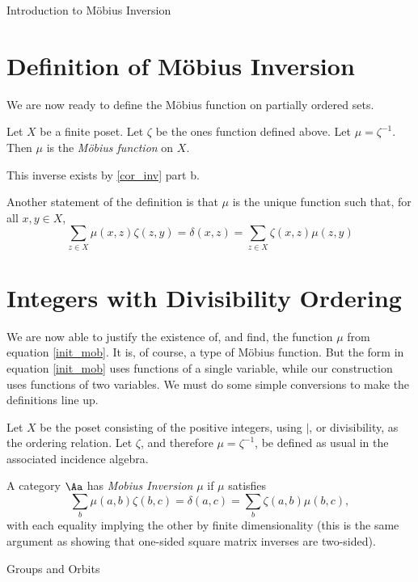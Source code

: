 \documentclass[12pt]{pom_thesis}
\begin{document}
\begin{chapter}{Introduction to M\"obius Inversion}
\section{Definition of M\"obius Inversion}
We are now ready to define the M\"obius function on partially ordered sets.
\begin{defn}\label{def_mob_pos}
Let $X$ be a finite poset. Let $\zeta$ be the ones function defined above. Let $\mu = \zeta^{-1}$. Then $\mu$ is the \emph{M\"obius function} on $X$.
\end{defn}
\begin{rmk}
This inverse exists by \ref{cor_inv} part b. 
\end{rmk}
\begin{rmk}
Another statement of the definition is that $\mu$ is the unique function such that, for all $x,y \in X$,
\[
\sum_{z \in X} \mu(x,z)\zeta(z,y) = \delta(x,z) = \sum_{z \in X} \zeta(x,z)\mu(z,y)
\]
\end{rmk}
\section{Integers with Divisibility Ordering}
We are now able to justify the existence of, and find, the function $\mu$ from equation \ref{init_mob}. It is, of course, a type of M\"obius function. But the form in equation \ref{init_mob} uses functions of a single variable, while our construction uses functions of two variables. We must do some simple conversions to make the definitions line up.

Let $X$ be the poset consisting of the positive integers, using $|$, or divisibility, as the ordering relation. Let $\zeta$, and therefore $\mu = \zeta^{-1}$, be defined as usual in the associated incidence algebra.
\end{chapter}
\begin{defn}
A category $\Aa$ has \emph{Mobius Inversion} $\mu$ if $\mu$ satisfies
\[
\sum_b \mu(a,b)\zeta(b,c) = \delta(a,c) = \sum_b \zeta(a,b)\mu(b,c),
\]
with each equality implying the other by finite dimensionality (this is the same argument as showing that one-sided square matrix inverses are two-sided).
\end{defn}
\begin{chapter}{Groups and Orbits}
\end{chapter}
\end{document}
